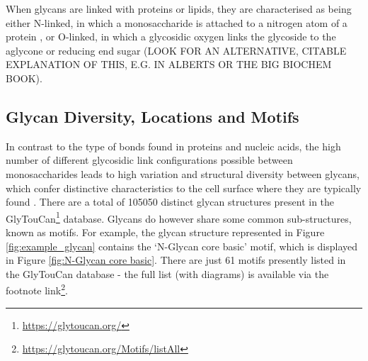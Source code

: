 \documentclass[12pt,a4paper]{article}
\begin{document}
When glycans are linked with proteins or lipids, they are characterised as being either N-linked, in which a monosaccharide is attached to a nitrogen atom of a protein \citep{taylor2011introduction}, or O-linked, in which a glycosidic oxygen links the glycoside to the aglycone or reducing end sugar (LOOK FOR AN ALTERNATIVE, CITABLE EXPLANATION OF THIS, E.G. IN ALBERTS OR THE BIG BIOCHEM BOOK).



















\subsection{Glycan Diversity, Locations and Motifs}
\label{sec:glycan_locations}
In contrast to the type of bonds found in proteins and nucleic acids, the high number of different glycosidic link configurations possible between monosaccharides leads to high variation and structural diversity between glycans, which confer distinctive characteristics to the cell surface where they are typically found \citep{10.1371/journal.pcbi.1002813}.
There are a total of 105050 distinct glycan structures present in the GlyTouCan\footnote{\url{https://glytoucan.org/}} database. Glycans do however share some common sub-structures, known as motifs. For example, the glycan structure represented in Figure \ref{fig:example_glycan} contains the `N-Glycan core basic' motif, which is displayed in Figure \ref{fig:N-Glycan core basic}. There are just 61 motifs presently listed in the GlyTouCan database - the full list (with diagrams) is available via the footnote link\footnote{\url{https://glytoucan.org/Motifs/listAll}}.
\end{document}
